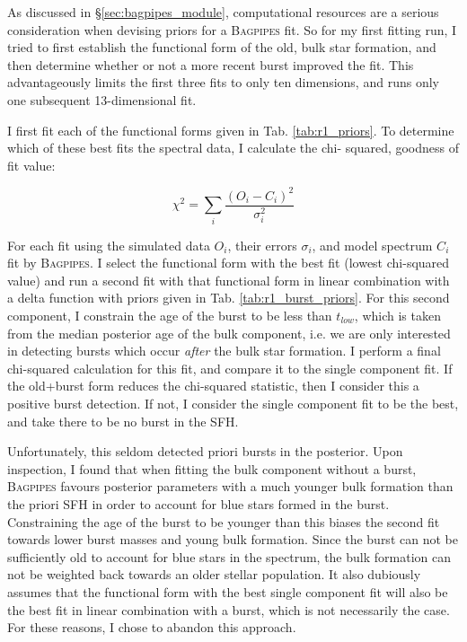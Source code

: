 \documentclass[a4paper,12pt]{article}
\begin{document}
As discussed in \S\ref{sec:bagpipes_module}, computational resources are a
serious consideration when devising priors for a \textsc{Bagpipes} fit. So for
my first fitting run, I tried to first establish the functional form of the
old, bulk star formation, and then determine whether or not a more recent burst
improved the fit. This advantageously limits the first three fits to only ten
dimensions, and runs only one subsequent 13-dimensional fit.

I first fit each of the functional forms given in Tab. \ref{tab:r1_priors}. To
determine which of these best fits the spectral data, I calculate the chi-
squared, goodness of fit value:

\begin{equation}
  \chi^2 = \sum_{i}\frac{(O_i - C_i)^2}{\sigma_i^2}
\end{equation}

\noindent For each fit using the simulated data $O_i$, their errors $\sigma_i$,
and model spectrum $C_i$ fit by \textsc{Bagpipes}. I select the functional form
with the best fit (lowest chi-squared value) and run a second fit with that
functional form in linear combination with a delta function with priors given
in Tab. \ref{tab:r1_burst_priors}. For this second component, I constrain the
age of the burst to be less than $t_{low}$, which is taken from the median
posterior age of the bulk component, i.e. we are only interested in detecting
bursts which occur \textit{after} the bulk star formation. I perform a final
chi-squared calculation for this fit, and compare it to the single component
fit. If the old+burst form reduces the chi-squared statistic, then I consider
this a positive burst detection. If not, I consider the single component fit to
be the best, and take there to be no burst in the SFH.

Unfortunately, this seldom detected priori bursts in the posterior. Upon
inspection, I found that when fitting the bulk component without a burst,
\textsc{Bagpipes} favours posterior parameters with a much younger bulk
formation than the priori SFH in order to account for blue stars formed in the
burst. Constraining the age of the burst to be younger than this biases the
second fit towards lower burst masses and young bulk formation. Since the burst
can not be sufficiently old to account for blue stars in the spectrum, the bulk
formation can not be weighted back towards an older stellar population. It also
dubiously assumes that the functional form with the best single component fit
will also be the best fit in linear combination with a burst, which is not
necessarily the case. For these reasons, I chose to abandon this approach.
\end{document}
